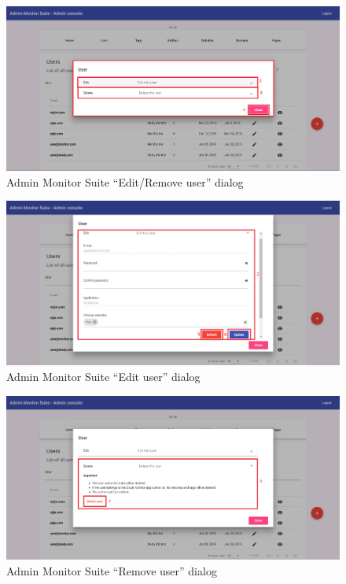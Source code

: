 \begin{figure}[H]
    \centering
    \includegraphics[width=\linewidth]{lib/images/admin/admin_edit_remove_user_dialog.png}
    \caption{Admin Monitor Suite ``Edit/Remove user'' dialog}
    \label{fig:admin_edit_remove_user_dialog}
\end{figure}

\begin{figure}[H]
    \centering
    \includegraphics[width=\linewidth]{lib/images/admin/admin_edit_user_dialog.png}
    \caption{Admin Monitor Suite ``Edit user'' dialog}
    \label{fig:admin_edit_user_dialog}
\end{figure}

\begin{figure}[H]
    \centering
    \includegraphics[width=\linewidth]{lib/images/admin/admin_remove_user_dialog.png}
    \caption{Admin Monitor Suite ``Remove user'' dialog}
    \label{fig:admin_remove_user_dialog}
\end{figure}

